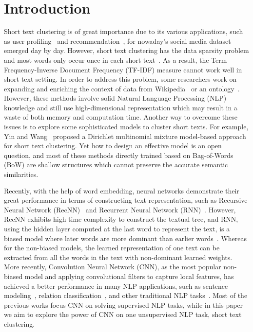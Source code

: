 \documentclass[review]{elsarticle}
\begin{document}

\section{Introduction}
\label{sec:Introduction}
Short text clustering is of great importance due to its various applications, such as user profiling~\cite{li-ritter-hovy:2014:P14-1} and recommendation~\cite{wang-EtAl:2010:ACL1}, for nowaday's social media dataset emerged day by day. However, short text clustering has the data sparsity problem and most words only occur once in each short text~\cite{15_aggarwal2012survey}. As a result, the Term Frequency-Inverse Document Frequency (TF-IDF) measure cannot work well in short text setting. In order to address this problem, some researchers work on expanding and enriching the context of data from Wikipedia~\cite{29_banerjee2007clustering} or an ontology~\cite{33_fodeh2011ontology}. However, these methods involve solid Natural Language Processing (NLP) knowledge and still use high-dimensional representation which may result in a waste of both memory and computation time. Another way to overcome these issues is to explore some sophisticated models to cluster short texts. For example, Yin and Wang~\cite{30_yin2014dirichlet} proposed a Dirichlet multinomial mixture model-based approach for short text clustering. Yet how to design an effective model is an open question, and most of these methods directly trained based on Bag-of-Words (BoW) are shallow structures which cannot preserve the accurate semantic similarities.

Recently, with the help of word embedding, neural networks demonstrate their great performance in terms of constructing text representation, such as Recursive Neural Network (RecNN)~\cite{24_socher2011semi,35_socher2013recursive} and Recurrent Neural Network (RNN)~\cite{38_mikolov2011extensions}. However, RecNN exhibits high time complexity to construct the textual tree, and RNN, using the hidden layer computed at the last word to represent the text, is a biased model where later words are more dominant than earlier words~\cite{14_lai2015rcnn}. Whereas for the non-biased models, the learned representation of one text can be extracted from all the words in the text with non-dominant learned weights. More recently, Convolution Neural Network (CNN), as the most popular non-biased model and applying convolutional filters to capture local features, has achieved a better performance in many NLP applications, such as sentence modeling~\cite{16_blunsom2014convolutional}, relation classification~\cite{34_zeng2014relation}, and other traditional NLP tasks~\cite{19_collobert2011natural}. Most of the previous works focus CNN on solving supervised NLP tasks, while in this paper we aim to explore the power of CNN on one unsupervised NLP task, short text clustering.
\end{document}

